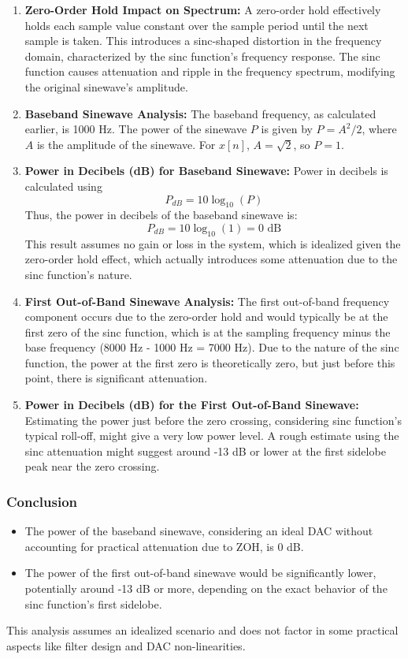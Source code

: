 \begin{enumerate}
    \item \textbf{Zero-Order Hold Impact on Spectrum:}
    A zero-order hold effectively holds each sample value constant over the sample period until the next sample is taken. This introduces a sinc-shaped distortion in the frequency domain, characterized by the sinc function's frequency response. The sinc function causes attenuation and ripple in the frequency spectrum, modifying the original sinewave's amplitude.

    \item \textbf{Baseband Sinewave Analysis:}
    The baseband frequency, as calculated earlier, is 1000 Hz. The power of the sinewave \(P\) is given by \(P = A^2/2\), where \(A\) is the amplitude of the sinewave. For \(x[n]\), \(A = \sqrt{2}\), so \(P = 1\).

    \item \textbf{Power in Decibels (dB) for Baseband Sinewave:}
    Power in decibels is calculated using
    $$
    P_{dB} = 10 \log_{10}(P)
    $$
    Thus, the power in decibels of the baseband sinewave is:
    $$
    P_{dB} = 10 \log_{10}(1) = 0 \text{ dB}
    $$
    This result assumes no gain or loss in the system, which is idealized given the zero-order hold effect, which actually introduces some attenuation due to the sinc function's nature.

    \item \textbf{First Out-of-Band Sinewave Analysis:}
    The first out-of-band frequency component occurs due to the zero-order hold and would typically be at the first zero of the sinc function, which is at the sampling frequency minus the base frequency (8000 Hz - 1000 Hz = 7000 Hz). Due to the nature of the sinc function, the power at the first zero is theoretically zero, but just before this point, there is significant attenuation.

    \item \textbf{Power in Decibels (dB) for the First Out-of-Band Sinewave:}
    Estimating the power just before the zero crossing, considering sinc function's typical roll-off, might give a very low power level. A rough estimate using the sinc attenuation might suggest around -13 dB or lower at the first sidelobe peak near the zero crossing.
\end{enumerate}

\subsubsection{Conclusion}
\begin{itemize}
    \item The power of the baseband sinewave, considering an ideal DAC without accounting for practical attenuation due to ZOH, is 0 dB.
    \item The power of the first out-of-band sinewave would be significantly lower, potentially around -13 dB or more, depending on the exact behavior of the sinc function's first sidelobe.
\end{itemize}

This analysis assumes an idealized scenario and does not factor in some practical aspects like filter design and DAC non-linearities.
